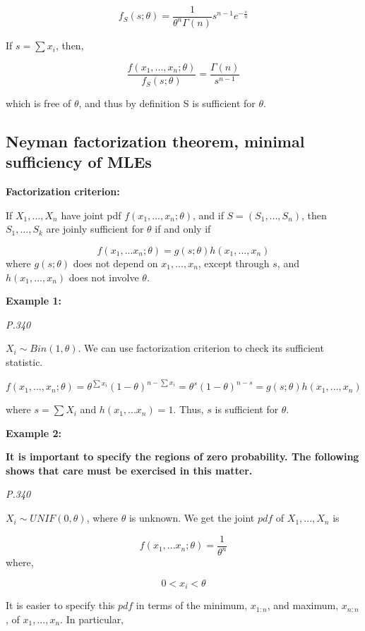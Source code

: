 \documentclass[]{book}
\begin{document}
\[f_S(s; \theta)=\frac{1}{\theta^n \Gamma(n)}s^{n-1}e^{-\frac{s}{n}}\]

If \(s=\sum x_i\), then,

\[\frac{f(x_1,...,x_n; \theta)}{f_S(s;\theta)}=\frac{\Gamma(n)}{s^{n-1}}\]

which is free of \(\theta\), and thus by definition S is sufficient for \(\theta\).

\hypertarget{neyman-factorization-theorem-minimal-sufficiency-of-mles}{%
\subsection{Neyman factorization theorem, minimal sufficiency of MLEs}\label{neyman-factorization-theorem-minimal-sufficiency-of-mles}}

\textbf{Factorization criterion:}

If \(X_1,...,X_n\) have joint pdf \(f(x_1,...,x_n; \theta)\), and if \(S=(S_1,...,S_n)\), then \(S_1,...,S_k\) are joinly sufficient for \(\theta\) if and only if

\[f(x_1,...x_n; \theta)=g(s;\theta)h(x_1,...,x_n)\]
where \(g(s;\theta)\) does not depend on \(x_1,...,x_n\), except through \(s\), and \(h(x_1,...,x_n)\) does not involve \(\theta\).

\textbf{Example 1:}

\emph{P.340}

\(X_i \sim Bin(1,\theta)\). We can use factorization criterion to check its sufficient statistic.

\[f(x_1,...,x_n;\theta)=\theta^{\sum x_i}(1-\theta)^{n-\sum x_i}=\theta^s(1-\theta)^{n-s}=g(s;\theta)h(x_1,...,x_n)\]

where \(s=\sum X_i\) and \(h(x_1,...x_n)=1\). Thus, \(s\) is sufficient for \(\theta\).

\textbf{Example 2:}

\textbf{It is important to specify the regions of zero probability. The following shows that care must be exercised in this matter.}

\emph{P.340}

\(X_i \sim UNIF(0,\theta)\), where \(\theta\) is unknown. We get the joint \(pdf\) of \(X_1,...,X_n\) is

\[f(x_1,...x_n; \theta)=\frac{1}{\theta^n}\]
where,

\[0<x_i<\theta\]

It is easier to specify this \(pdf\) in terms of the minimum, \(x_{1:n}\), and maximum, \(x_{n:n}\), of \(x_1,...,x_n\). In particular,
\end{document}
